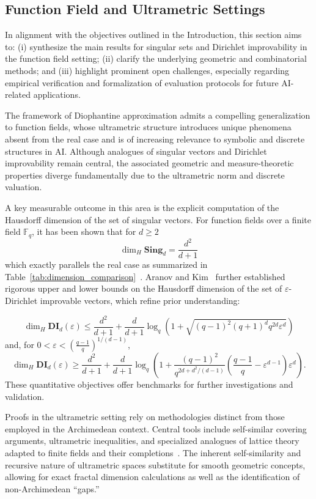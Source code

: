 \documentclass[sigconf]{acmart}
\begin{document}
\subsection{Function Field and Ultrametric Settings}

In alignment with the objectives outlined in the Introduction, this section aims to: (i) synthesize the main results for singular sets and Dirichlet improvability in the function field setting; (ii) clarify the underlying geometric and combinatorial methods; and (iii) highlight prominent open challenges, especially regarding empirical verification and formalization of evaluation protocols for future AI-related applications.

The framework of Diophantine approximation admits a compelling generalization to function fields, whose ultrametric structure introduces unique phenomena absent from the real case and is of increasing relevance to symbolic and discrete structures in AI. Although analogues of singular vectors and Dirichlet improvability remain central, the associated geometric and measure-theoretic properties diverge fundamentally due to the ultrametric norm and discrete valuation.

A key measurable outcome in this area is the explicit computation of the Hausdorff dimension of the set of singular vectors. For function fields over a finite field $\mathbb{F}_q$, it has been shown that for $d \geq 2$
\[
\dim_H \mathbf{Sing}_d = \frac{d^2}{d+1}
\]
which exactly parallels the real case as summarized in Table~\ref{tab:dimension_comparison}~\cite{ref79,ref109}. Aranov and Kim~\cite{ref79} further established rigorous upper and lower bounds on the Hausdorff dimension of the set of $\varepsilon$-Dirichlet improvable vectors, which refine prior understanding:

\[
\dim_H \mathbf{DI}_d(\varepsilon) \leq \frac{d^2}{d+1} + \frac{d}{d+1} \log_q\left(1 + \sqrt{(q-1)^2 (q+1)^d q^{2d} \varepsilon^d}\right)
\]
and, for $0 < \varepsilon < \left(\frac{q-1}{q}\right)^{1/(d-1)}$,
\[
\dim_H \mathbf{DI}_d(\varepsilon) \geq \frac{d^2}{d+1} + \frac{d}{d+1} \log_q\left(1+\frac{(q-1)^2}{q^{2d + d^2/(d-1)}}\left(\frac{q-1}{q} - \varepsilon^{d-1}\right)\varepsilon^d\right).
\]
These quantitative objectives offer benchmarks for further investigations and validation.

Proofs in the ultrametric setting rely on methodologies distinct from those employed in the Archimedean context. Central tools include self-similar covering arguments, ultrametric inequalities, and specialized analogues of lattice theory adapted to finite fields and their completions~\cite{ref79}. The inherent self-similarity and recursive nature of ultrametric spaces substitute for smooth geometric concepts, allowing for exact fractal dimension calculations as well as the identification of non-Archimedean ``gaps.'' 
\end{document}
